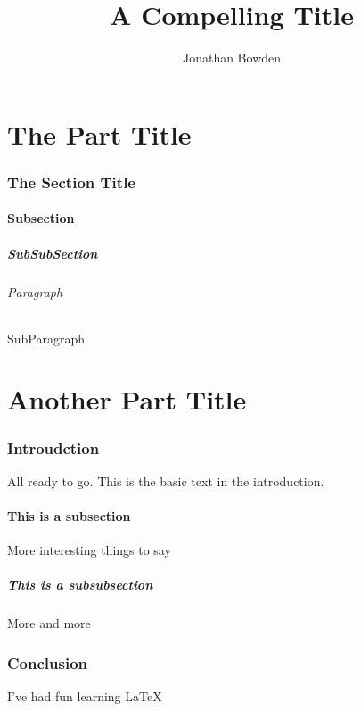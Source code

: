 \documentclass{article}
\title{A Compelling Title}
\author{Jonathan Bowden}
\begin{document}
\maketitle

\part{The Part Title}
\section {The Section Title}
\subsection {Subsection}
\subsubsection {SubSubSection}
\paragraph {Paragraph}
\subparagraph {SubParagraph}

\part{Another Part Title}
\section{Introudction}

All ready to go. This is the basic text in the introduction.

\subsection{This is a subsection}

More interesting things to say

\subsubsection{This is a subsubsection}

More and more

\section{Conclusion}

I've had fun learning \LaTeX
\end{document}
